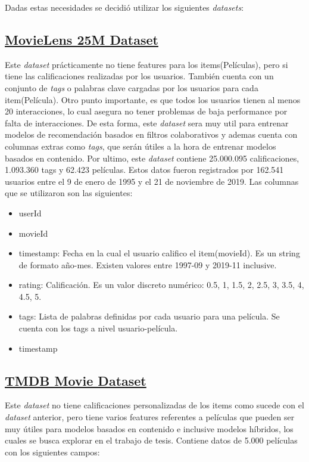 \documentclass[11pt,a4paper,twoside]{thesis}
\begin{document}
Dadas estas necesidades se decidió utilizar los siguientes \textit{datasets}:


\subsection{\href{https://grouplens.org/datasets/movielens/25m/}{MovieLens 25M Dataset}}

Este \textit{dataset} prácticamente no tiene features para los items(Películas), pero si tiene las calificaciones realizadas 
por los usuarios. También cuenta con un conjunto de \textit{tags} o palabras clave cargadas por los usuarios para cada 
item(Película). Otro punto importante, es que todos los usuarios tienen al menos 20 interacciones, lo cual asegura
no tener problemas de baja performance por falta de interacciones. 
De esta forma, este \textit{dataset} sera muy util para entrenar modelos de recomendación basados en filtros colaborativos
y ademas cuenta con columnas extras como \textit{tags}, que serán útiles a la hora de entrenar modelos basados en contenido.
Por ultimo, este \textit{dataset} contiene 25.000.095 calificaciones, 1.093.360 tags y 62.423 películas. Estos datos fueron registrados por 162.541 usuarios entre el 9 de enero de 1995 y el 21 de noviembre de 2019. Las columnas que se utilizaron son las siguientes:

\begin{itemize}
	\item userId 
	\item movieId
	\item timestamp: Fecha en la cual el usuario califico el item(movieId). Es un string de formato año-mes. Existen valores entre 1997-09 y 2019-11 inclusive.
	\item rating:    Calificación. Es un valor discreto numérico: 0.5, 1, 1.5, 2, 2.5, 3, 3.5, 4, 4.5, 5.
	\item tags:      Lista de palabras definidas por cada usuario para una película. Se cuenta con los tags a nivel usuario-película.
	\item timestamp
\end{itemize}


\subsection{\href{https://www.kaggle.com/datasets/rounakbanik/the-movies-dataset?select=movies_metadata.csv}{TMDB Movie Dataset}}

Este \textit{dataset} no tiene calificaciones personalizadas de los items como sucede con el \textit{dataset} anterior, 
pero tiene varios features referentes a películas que pueden ser muy útiles para modelos basados en contenido e inclusive
modelos híbridos, los cuales se busca explorar en el trabajo de tesis. Contiene datos de 5.000 películas con los siguientes campos:
\end{document}
